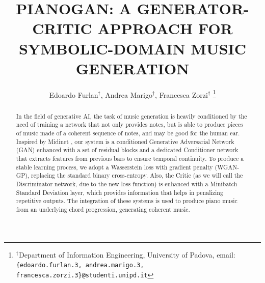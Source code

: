 \documentclass[10pt, conference, letterpaper]{IEEEtran}
\title{PIANOGAN: A GENERATOR-CRITIC APPROACH FOR SYMBOLIC-DOMAIN MUSIC GENERATION}
\author{Edoardo Furlan$^\dag$, Andrea Marigo$^\dag$, Francesca Zorzi$^\dag$
\thanks{$^\dag$Department of Information Engineering, University of Padova, \newline email: \texttt{\{edoardo.furlan.3, andrea.marigo.3, francesca.zorzi.3\}@studenti.unipd.it}}
}
\newcommand\MR[1]{\textcolor{blue}{#1}}
\begin{document}
\maketitle

\begin{abstract}
  In the field of generative AI, the task of music generation is heavily conditioned by the need of training a network that not only provides notes, but is able to produce pieces of music made of a coherent sequence of notes, and may be good for the human ear.
  Inspired by Midinet \cite{Yang-2017}, our system is a conditioned Generative Adversarial Network (GAN) enhanced with a set of residual blocks and a dedicated Conditioner network that extracts features from previous bars to ensure temporal continuity.
  To produce a stable learning process, we adopt a Wasserstein loss with gradient penalty (WGAN-GP), replacing the standard binary cross-entropy. Also, the Critic (as we will call the Discriminator network, due to the new loss function) is enhanced with a Minibatch Standard Deviation layer, which provides information that helps in penalizing repetitive outputs.
  The integration of these systems is used to produce piano music from an underlying chord progression, generating coherent music.


\end{abstract}
\end{document}
